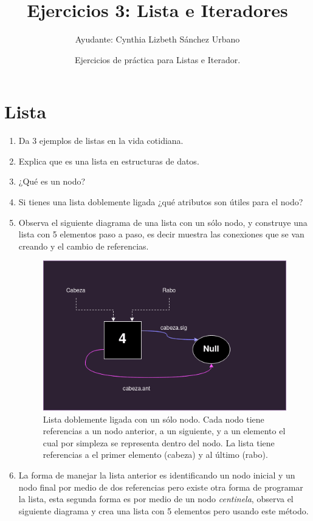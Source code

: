 \documentclass[12pt]{article} %
\begin{document}
\title{Ejercicios 3: Lista e Iteradores}
\author{Ayudante: Cynthia Lizbeth Sánchez Urbano}
\date{Ejercicios de práctica para Listas e Iterador.}
\maketitle
\section{Lista}
\begin{enumerate}
\item Da 3 ejemplos de listas en la vida cotidiana.
\item Explica que es una lista en estructuras de datos.
\item ¿Qué es un nodo?
\item Si tienes una lista doblemente ligada ¿qué atributos son útiles para el nodo?
\item Observa el siguiente diagrama de una lista con un sólo nodo, y construye una lista con 5 elementos paso a paso, es decir muestra las conexiones que se van creando y el cambio de referencias.
\begin{figure}[H]
\centering
\includegraphics[scale=0.5]{ListaUnNodo.png}
\caption{Lista doblemente ligada con un sólo nodo. Cada nodo tiene referencias a un nodo anterior, a un siguiente, y a un elemento el cual por simpleza se representa dentro del nodo. La lista tiene referencias a el primer elemento (cabeza) y al último (rabo).}
\end{figure}
\item La forma de manejar la lista anterior es identificando un nodo inicial y un nodo final por medio de dos referencias pero existe otra forma de programar la lista, esta segunda forma es por medio de un nodo \textit{centinela}, observa el siguiente diagrama y crea una lista con 5 elementos pero usando este método.

\end{enumerate}
\end{document}
